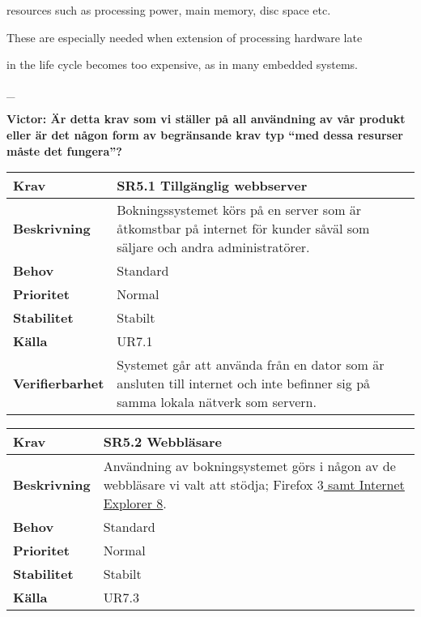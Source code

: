 \documentclass[a4paper, twoside, 11pt, titlepage]{article}
\begin{document}
resources such as processing power, main memory, disc space etc.

These are especially needed when extension of processing hardware late

in the life cycle becomes too expensive, as in many embedded systems.

\_

\textbf{Victor: Är detta krav som vi ställer på all användning av vår produkt eller är det någon form av begränsande krav typ ``med dessa resurser måste det fungera''?}

\begin{tabular} { p{2.6cm} p{12.5cm} }
	\hline
	\sffamily\textbf{Krav} & \sffamily\textbf{SR5.1 Tillgänglig webbserver } \\
	\hline
	\sffamily\textbf{Beskrivning} & Bokningssystemet körs på en server som är åtkomstbar på internet för kunder såväl som säljare och andra administratörer.  \\
	\hline
	\sffamily\textbf{Behov} & Standard  \\
	\hline
	\sffamily\textbf{Prioritet} & Normal  \\
	\hline
	\sffamily\textbf{Stabilitet} & Stabilt  \\
	\hline
	\sffamily\textbf{Källa} & UR7.1  \\
	\hline
	\sffamily\textbf{Verifierbarhet} & Systemet går att använda från en dator som är ansluten till internet och inte befinner sig på samma lokala nätverk som servern.  \\
	\hline
\end{tabular}
\vspace{6mm}

\begin{tabular} { p{2.6cm} p{12.5cm} }
	\hline
	\sffamily\textbf{Krav} & \sffamily\textbf{SR5.2 Webbläsare } \\
	\hline
	\sffamily\textbf{Beskrivning} & Användning av bokningsystemet görs i någon av de webbläsare vi valt att stödja; Firefox 3\underline{ samt Internet Explorer 8}.  \\
	\hline
	\sffamily\textbf{Behov} & Standard  \\
	\hline
	\sffamily\textbf{Prioritet} & Normal  \\
	\hline
	\sffamily\textbf{Stabilitet} & Stabilt  \\
	\hline
	\sffamily\textbf{Källa} & UR7.3  \\
	\hline
\end{tabular}
\vspace{6mm}
\end{document}
